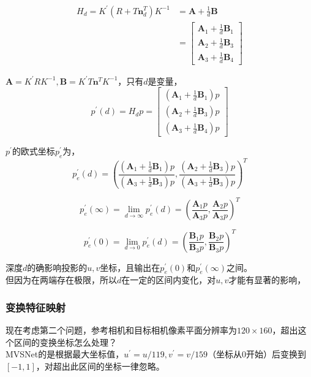 	\begin{align*}
		H_d= K^{\prime}\left(R + T\mathbf{n}_d^T\right)K^{-1} &= \mathbf{A} +\frac{1}{d}\mathbf{B}\\
		&= \begin{bmatrix}
			\mathbf{A}_1 + \frac{1}{d}\mathbf{B}_1\\
			\mathbf{A}_2 + \frac{1}{d}\mathbf{B}_3\\
			\mathbf{A}_3 + \frac{1}{d}\mathbf{B}_4
		\end{bmatrix}
	\end{align*}

	$\mathbf{A}=K^\prime R K^{-1},\mathbf{B}=K^{\prime}T\mathbf{n}^TK^{-1}$，只有$d$是变量，
	$$
		p^\prime(d) = H_d p = \begin{bmatrix}
			\left(\mathbf{A}_1 + \frac{1}{d}\mathbf{B}_1\right)p\\
			\left(\mathbf{A}_2 + \frac{1}{d}\mathbf{B}_3\right)p\\
			\left(\mathbf{A}_3 + \frac{1}{d}\mathbf{B}_4\right)p
		\end{bmatrix}
	$$

	$p^\prime$的欧式坐标$p^\prime_e$为，
	$$
		p^\prime_e(d) = \left(
			\frac{\left(\mathbf{A}_1 + \frac{1}{d}\mathbf{B}_1\right)p}{\left(\mathbf{A}_3 + \frac{1}{d}\mathbf{B}_3\right)p},
			\frac{\left(\mathbf{A}_2 + \frac{1}{d}\mathbf{B}_3\right)p}{\left(\mathbf{A}_3 + \frac{1}{d}\mathbf{B}_3\right)p}
		\right)^T
	$$

	$$
		p^\prime_e(\infty) = \lim_{d\rightarrow \infty}p^\prime_e(d) = \left(
			\frac{\mathbf{A}_1p}{\mathbf{A}_3p},
			\frac{\mathbf{A}_2p}{\mathbf{A}_3p}
		\right)^T
	$$

	$$
		p^\prime_e(0) = \lim_{d\rightarrow 0}p^\prime_e(d) = \left(
			\frac{\mathbf{B}_1p}{\mathbf{B}_3p},
			\frac{\mathbf{B}_2p}{\mathbf{B}_3p}
		\right)^T
	$$	

	深度$d$的确影响投影的$u,v$坐标，且输出在$p^\prime_e(0)$和$p^\prime_e(\infty)$之间。\\

	但因为在两端存在极限，所以$d$在一定的区间内变化，对$u,v$才能有显著的影响，
	
	\subsubsection*{变换特征映射}
		现在考虑第二个问题，参考相机和目标相机像素平面分辨率为$120 \times 160$，超出这个区间的变换坐标怎么处理？\\

		MVSNet的是根据最大坐标值，$u^\prime = u/119, v^\prime = v/159$（坐标从0开始）后变换到$[-1,1]$，对超出此区间的坐标一律忽略。\\


